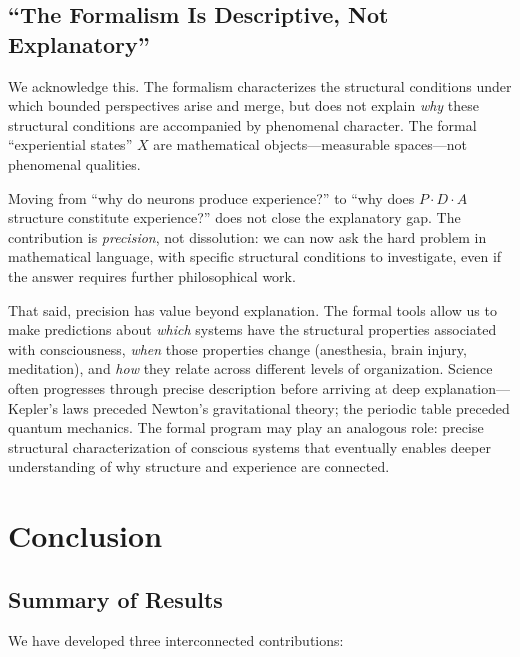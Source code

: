 \documentclass[11pt,a4paper]{article}
\theoremstyle{definition}
\theoremstyle{plain}
\theoremstyle{remark}
\begin{document}
\subsection{``The Formalism Is Descriptive, Not Explanatory''}

We acknowledge this. The formalism characterizes the structural conditions under which bounded perspectives arise and merge, but does not explain \textit{why} these structural conditions are accompanied by phenomenal character. The formal ``experiential states'' $X$ are mathematical objects---measurable spaces---not phenomenal qualities.

Moving from ``why do neurons produce experience?'' to ``why does $P \cdot D \cdot A$ structure constitute experience?'' does not close the explanatory gap. The contribution is \textit{precision}, not dissolution: we can now ask the hard problem in mathematical language, with specific structural conditions to investigate, even if the answer requires further philosophical work.

That said, precision has value beyond explanation. The formal tools allow us to make predictions about \textit{which} systems have the structural properties associated with consciousness, \textit{when} those properties change (anesthesia, brain injury, meditation), and \textit{how} they relate across different levels of organization. Science often progresses through precise description before arriving at deep explanation---Kepler's laws preceded Newton's gravitational theory; the periodic table preceded quantum mechanics. The formal program may play an analogous role: precise structural characterization of conscious systems that eventually enables deeper understanding of why structure and experience are connected.

\section{Conclusion}\label{sec:conclusion}

\subsection{Summary of Results}

We have developed three interconnected contributions:
\end{document}
